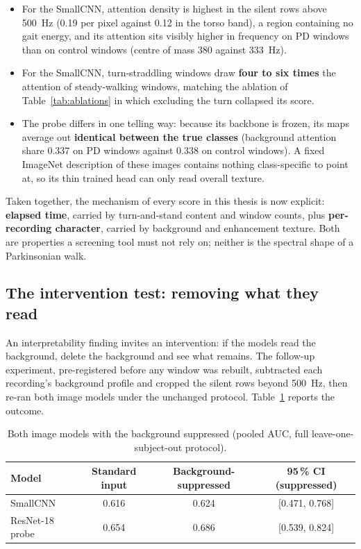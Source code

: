 \begin{itemize}
  \item For the SmallCNN, attention density is highest in the silent rows
        above 500~Hz (0.19 per pixel against 0.12 in the torso band), a
        region containing no gait energy, and its attention sits visibly
        higher in frequency on PD windows than on control windows (centre of
        mass 380 against 333~Hz).
  \item For the SmallCNN, turn-straddling windows draw \textbf{four to six
        times} the attention of steady-walking windows, matching the
        ablation of Table~\ref{tab:ablations} in which excluding the turn
        collapsed its score.
  \item The probe differs in one telling way: because its backbone
        is frozen, its maps average out \textbf{identical between the true
        classes} (background attention share 0.337 on PD windows against
        0.338 on control windows). A fixed ImageNet description of these
        images contains nothing class-specific to point at, so its thin
        trained head can only read overall texture.
\end{itemize}

Taken together, the mechanism of every score in this thesis is now
explicit: \textbf{elapsed time}, carried by turn-and-stand content and
window counts, plus \textbf{per-recording character}, carried by background
and enhancement texture. Both are properties a screening tool must not rely
on; neither is the spectral shape of a Parkinsonian walk.

\subsection{The intervention test: removing what they read}
\label{sec:disc-intervention}

An interpretability finding invites an intervention: if the models read the
background, delete the background and see what remains. The follow-up
experiment, pre-registered before any window was rebuilt, subtracted each
recording's background profile and cropped the silent rows beyond 500~Hz,
then re-ran both image models under the unchanged protocol.
Table~\ref{tab:bgsuppressed} reports the outcome.

\begin{table}[H]
  \centering
  \caption[Background-suppressed results]{Both image models with the background suppressed (pooled AUC,
  full leave-one-subject-out protocol).}
  \label{tab:bgsuppressed}
  \small
  \begin{tabular}{@{}lccc@{}}
    \toprule
    Model & Standard input & Background-suppressed & 95\,\% CI (suppressed) \\
    \midrule
    SmallCNN        & 0.616 & 0.624 & [0.471, 0.768] \\
    ResNet-18 probe & 0.654 & 0.686 & [0.539, 0.824] \\
    \bottomrule
  \end{tabular}
\end{table}


